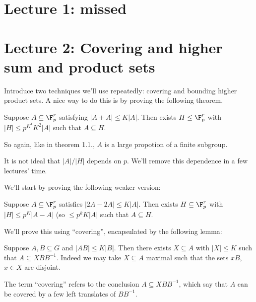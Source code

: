 \documentclass[a4paper]{article}
\begin{document}


\tableofcontents

\section{Lecture 1: missed}

\clearpage


\section{Lecture 2: Covering and higher sum and product sets}

Introduce two techniques we'll use repeatedly: covering and bounding higher product sets. A nice way to do this is by proving the following theorem.

\begin{theorem}[Ruzsa]
  Suppose \(A \subseteq \F_p^r\) satisfying \(|A + A| \leq K |A|\). Then exists \(H \leq \F_p^r\) with \(|H| \leq p^{K^4} K^2 |A|\) such that \(A \subseteq H\).
\end{theorem}

So again, like in theorem 1.1., \(A\) is a large propotion of a finite subgroup.

\begin{remark}
  It is not ideal that \(|A|/|H|\) depends on \(p\). We'll remove this dependence in a few lectures' time.
\end{remark}

We'll start by proving the following weaker version:

\begin{proposition}
  Suppose \(A \subseteq \F_p^r\) satisfies \(|2A - 2A| \leq K |A|\). Then exists \(H \subseteq \F_p^r\) with \(|H| \leq p^K|A - A|\) (so \(\leq p^k K|A|\) such that \(A \subseteq H\).
\end{proposition}

We'll prove this using ``covering'', encapsulated by the following lemma:

\begin{lemma}
  Suppose \(A, B \subseteq G\) and \(|AB| \leq K |B|\). Then there exists \(X \subseteq A\) with \(|X| \leq K\) such that \(A \subseteq XBB^{-1}\). Indeed we may take \(X \subseteq A\) maximal such that the sets \(xB\), \(x \in X\) are disjoint.
\end{lemma}

The term ``covering'' refers to the conclusion \(A \subseteq XBB^{-1}\), which say that \(A\) can be covered by a few left translates of \(BB^{-1}\).
\end{document}

